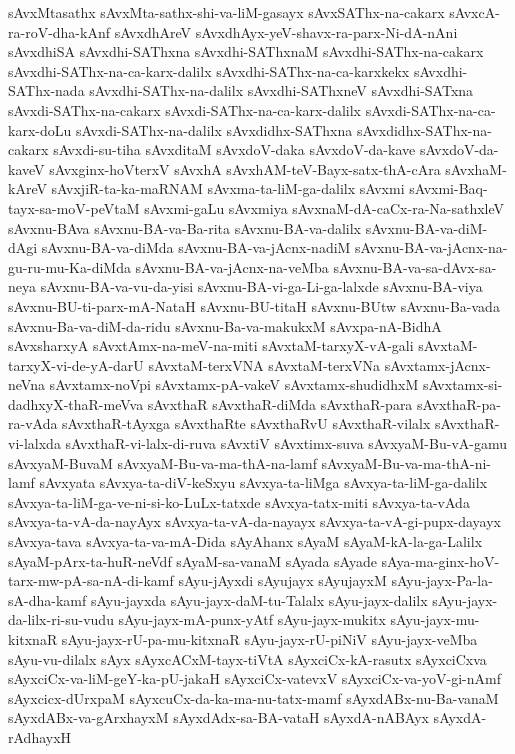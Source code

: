 {sAvxMtasathx
sAvxMta-sathx-shi-va-liM-gasayx
sAvxSAThx-na-cakarx
sAvxcA-ra-roV-dha-kAnf
sAvxdhAreV
sAvxdhAyx-yeV-shavx-ra-parx-Ni-dA-nAni
sAvxdhiSA
sAvxdhi-SAThxna
sAvxdhi-SAThxnaM
sAvxdhi-SAThx-na-cakarx
sAvxdhi-SAThx-na-ca-karx-dalilx
sAvxdhi-SAThx-na-ca-karxkekx
sAvxdhi-SAThx-nada
sAvxdhi-SAThx-na-dalilx
sAvxdhi-SAThxneV
sAvxdhi-SATxna
sAvxdi-SAThx-na-cakarx
sAvxdi-SAThx-na-ca-karx-dalilx
sAvxdi-SAThx-na-ca-karx-doLu
sAvxdi-SAThx-na-dalilx
sAvxdidhx-SAThxna
sAvxdidhx-SAThx-na-cakarx
sAvxdi-su-tiha
sAvxditaM
sAvxdoV-daka
sAvxdoV-da-kave
sAvxdoV-da-kaveV
sAvxginx-hoVterxV
sAvxhA
sAvxhAM-teV-Bayx-satx-thA-cAra
sAvxhaM-kAreV
sAvxjiR-ta-ka-maRNAM
sAvxma-ta-liM-ga-dalilx
sAvxmi
sAvxmi-Baq-tayx-sa-moV-peVtaM
sAvxmi-gaLu
sAvxmiya
sAvxnaM-dA-caCx-ra-Na-sathxleV
sAvxnu-BAva
sAvxnu-BA-va-Ba-rita
sAvxnu-BA-va-dalilx
sAvxnu-BA-va-diM-dAgi
sAvxnu-BA-va-diMda
sAvxnu-BA-va-jAcnx-nadiM
sAvxnu-BA-va-jAcnx-na-gu-ru-mu-Ka-diMda
sAvxnu-BA-va-jAcnx-na-veMba
sAvxnu-BA-va-sa-dAvx-sa-neya
sAvxnu-BA-va-vu-da-yisi
sAvxnu-BA-vi-ga-Li-ga-lalxde
sAvxnu-BA-viya
sAvxnu-BU-ti-parx-mA-NataH
sAvxnu-BU-titaH
sAvxnu-BUtw
sAvxnu-Ba-vada
sAvxnu-Ba-va-diM-da-ridu
sAvxnu-Ba-va-makukxM
sAvxpa-nA-BidhA
sAvxsharxyA
sAvxtAmx-na-meV-na-miti
sAvxtaM-tarxyX-vA-gali
sAvxtaM-tarxyX-vi-de-yA-darU
sAvxtaM-terxVNA
sAvxtaM-terxVNa
sAvxtamx-jAcnx-neVna
sAvxtamx-noVpi
sAvxtamx-pA-vakeV
sAvxtamx-shudidhxM
sAvxtamx-si-dadhxyX-thaR-meVva
sAvxthaR
sAvxthaR-diMda
sAvxthaR-para
sAvxthaR-pa-ra-vAda
sAvxthaR-tAyxga
sAvxthaRte
sAvxthaRvU
sAvxthaR-vilalx
sAvxthaR-vi-lalxda
sAvxthaR-vi-lalx-di-ruva
sAvxtiV
sAvxtimx-suva
sAvxyaM-Bu-vA-gamu
sAvxyaM-BuvaM
sAvxyaM-Bu-va-ma-thA-na-lamf
sAvxyaM-Bu-va-ma-thA-ni-lamf
sAvxyata
sAvxya-ta-diV-keSxyu
sAvxya-ta-liMga
sAvxya-ta-liM-ga-dalilx
sAvxya-ta-liM-ga-ve-ni-si-ko-LuLx-tatxde
sAvxya-tatx-miti
sAvxya-ta-vAda
sAvxya-ta-vA-da-nayAyx
sAvxya-ta-vA-da-nayayx
sAvxya-ta-vA-gi-pupx-dayayx
sAvxya-tava
sAvxya-ta-va-mA-Dida
sAyAhanx
sAyaM
sAyaM-kA-la-ga-Lalilx
sAyaM-pArx-ta-huR-neVdf
sAyaM-sa-vanaM
sAyada
sAyade
sAya-ma-ginx-hoV-tarx-mw-pA-sa-nA-di-kamf
sAyu-jAyxdi
sAyujayx
sAyujayxM
sAyu-jayx-Pa-la-sA-dha-kamf
sAyu-jayxda
sAyu-jayx-daM-tu-Talalx
sAyu-jayx-dalilx
sAyu-jayx-da-lilx-ri-su-vudu
sAyu-jayx-mA-punx-yAtf
sAyu-jayx-mukitx
sAyu-jayx-mu-kitxnaR
sAyu-jayx-rU-pa-mu-kitxnaR
sAyu-jayx-rU-piNiV
sAyu-jayx-veMba
sAyu-vu-dilalx
sAyx
sAyxcACxM-tayx-tiVtA
sAyxciCx-kA-rasutx
sAyxciCxva
sAyxciCx-va-liM-geY-ka-pU-jakaH
sAyxciCx-vatevxV
sAyxciCx-va-yoV-gi-nAmf
sAyxcicx-dUrxpaM
sAyxcuCx-da-ka-ma-nu-tatx-mamf
sAyxdABx-nu-Ba-vanaM
sAyxdABx-va-gArxhayxM
sAyxdAdx-sa-BA-vataH
sAyxdA-nABAyx
sAyxdA-rAdhayxH
}
